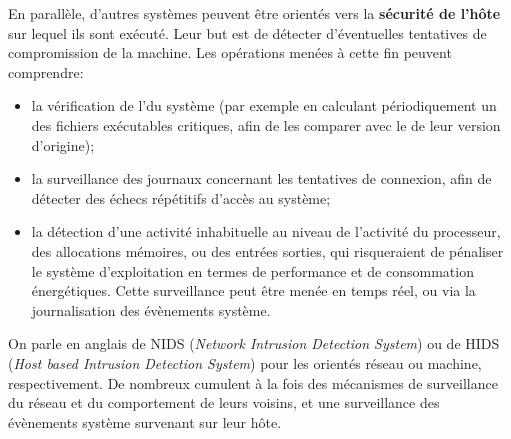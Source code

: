 En parallèle, d'autres systèmes peuvent être orientés vers la \textbf{sécurité de l'hôte} sur lequel ils sont exécuté.
Leur but est de détecter d'éventuelles tentatives de compromission de la machine.
Les opérations menées à cette fin peuvent comprendre:
\begin{itemize}
    \item la vérification de l'\integrite du système (par exemple en calculant périodiquement un  des fichiers exécutables critiques, afin de les comparer avec le  de leur version d'origine);
    \item la surveillance des journaux concernant les tentatives de connexion, afin de détecter des échecs répétitifs d'accès au système;
    \item la détection d'une activité inhabituelle au niveau de l'activité du processeur, des allocations mémoires, ou des entrées sorties, qui risqueraient de pénaliser le système d'exploitation en termes de performance et de consommation énergétiques. Cette surveillance peut être menée en temps réel, ou via la journalisation des évènements système.
\end{itemize}
On parle en anglais de NIDS (\textit{Network Intrusion Detection System}) ou de HIDS (\textit{Host based Intrusion Detection System}) pour les \IDS orientés réseau ou machine, respectivement.
De nombreux \IDS cumulent à la fois des mécanismes de surveillance du réseau et du comportement de leurs voisins, et une surveillance des évènements système survenant sur leur hôte.

